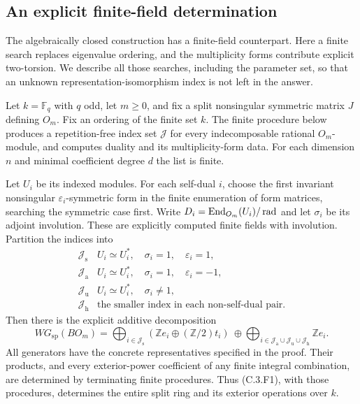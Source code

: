 \subsection{An explicit finite-field determination}

The algebraically closed construction has a finite-field counterpart.
Here a finite search replaces eigenvalue ordering, and the multiplicity
forms contribute explicit two-torsion. We describe all those searches,
including the parameter set, so that an unknown representation-isomorphism
index is not left in the answer.

\begin{theorem}
\label{C:Om-finite-field-algorithm}
Let $k=\mathbb F_q$ with $q$ odd, let $m\geq0$, and fix a split
nonsingular symmetric matrix $J$ defining $O_m$. Fix an ordering of
the finite set $k$. The finite procedure below produces a repetition-free
index set $\mathscr J$ for every indecomposable rational $O_m$-module,
and computes duality and its multiplicity-form data. For each
dimension $n$ and minimal coefficient degree $d$ the list is finite.

Let $U_i$ be its indexed modules. For each self-dual $i$, choose the first
invariant nonsingular $\varepsilon_i$-symmetric form in the finite
enumeration of form matrices, searching the symmetric case first.
Write $D_i=\operatorname{End}_{O_m}(U_i)/\operatorname{rad}$ and let $\sigma_i$ be
its adjoint involution. These are explicitly computed finite fields
with involution. Partition the indices into
\[
 \begin{array}{c|l}
 \mathscr J_{\mathrm s}&U_i\simeq U_i^*,\quad
       \sigma_i=1,\quad\varepsilon_i=1,\\
 \mathscr J_{\mathrm a}&U_i\simeq U_i^*,\quad
       \sigma_i=1,\quad\varepsilon_i=-1,\\
 \mathscr J_{\mathrm u}&U_i\simeq U_i^*,\quad\sigma_i\ne1,\\
 \mathscr J_{\mathrm h}&\text{the smaller index in each non-self-dual pair.}
 \end{array}
\]
Then there is the explicit additive decomposition
\[
 WG_{\mathrm{sp}}(BO_m)=
 \bigoplus_{i\in\mathscr J_{\mathrm s}}
       (\mathbb Z e_i\oplus(\mathbb Z/2)t_i)
 \ \oplus\!
 \bigoplus_{i\in\mathscr J_{\mathrm a}\cup
                    \mathscr J_{\mathrm u}\cup\mathscr J_{\mathrm h}}
       \mathbb Z e_i.                                      \tag{C.3.F1}
\]
All generators have the concrete representatives specified in the proof.
Their products, and every exterior-power coefficient of any finite
integral combination, are determined by terminating finite procedures.
Thus (C.3.F1), with those procedures, determines the entire split ring
and its exterior operations over $k$.
\end{theorem}
